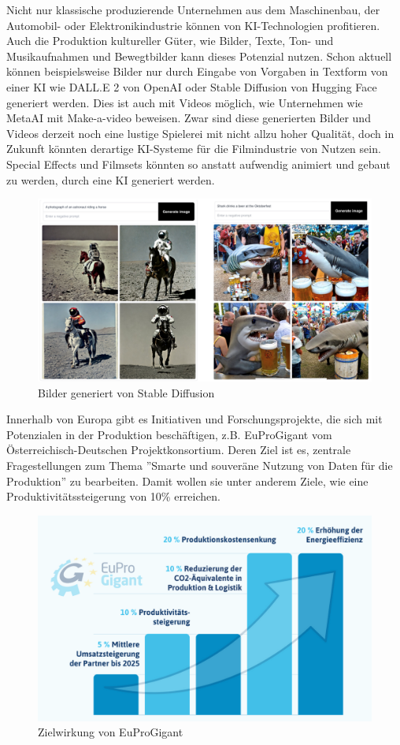 \documentclass[a4paper,12pt, german]{report}
\begin{document}
Nicht nur klassische produzierende Unternehmen aus dem Maschinenbau, der Automobil- oder Elektronikindustrie können von KI-Technologien profitieren. Auch die Produktion kultureller Güter, wie Bilder, Texte, Ton- und Musikaufnahmen und Bewegtbilder kann dieses Potenzial nutzen. Schon aktuell können beispielsweise Bilder nur durch Eingabe von Vorgaben in Textform von einer KI wie DALL.E 2 von OpenAI oder Stable Diffusion von Hugging Face generiert werden. Dies ist auch mit Videos möglich, wie Unternehmen wie MetaAI mit Make-a-video beweisen. Zwar sind diese generierten Bilder und Videos derzeit noch eine lustige Spielerei mit nicht allzu hoher Qualität, doch in Zukunft könnten derartige KI-Systeme für die Filmindustrie von Nutzen sein. Special Effects und Filmsets könnten so anstatt aufwendig animiert und gebaut zu werden, durch eine KI generiert werden.

\begin{figure}[H]
  \center
 \includegraphics[width=13cm]{images/stableDif.png}
  \caption[Bilder generiert von Stable Diffusion]{Bilder generiert von Stable Diffusion \cite{38}}
\end{figure}

Innerhalb von Europa gibt es Initiativen und Forschungsprojekte, die sich mit Potenzialen in der Produktion beschäftigen, z.B. EuProGigant vom Österreichisch-Deutschen Projektkonsortium. Deren Ziel ist es, zentrale Fragestellungen zum Thema ''Smarte und souveräne Nutzung von Daten für die Produktion'' zu bearbeiten. Damit wollen sie unter anderem Ziele, wie eine Produktivitätssteigerung von 10\% erreichen.\cite{39}
\begin{figure}
  \center
 \includegraphics[width=13cm]{images/eupro.png}
  \caption[Zielwirkung von EuProGigant]{Zielwirkung von EuProGigant \cite{39}}
\end{figure}
\end{document}
